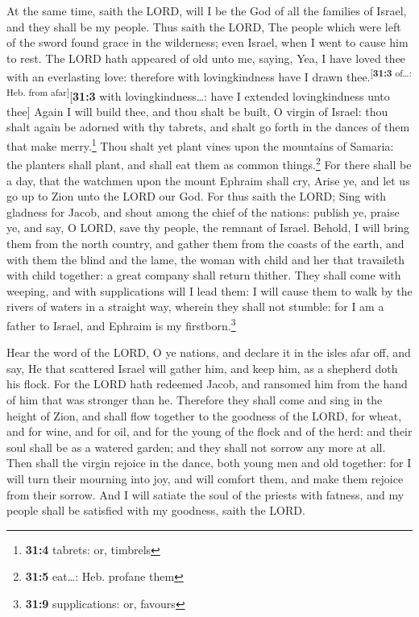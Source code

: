  At the same time, saith the LORD, will I be the God of
all the families of Israel, and they shall be my people. 
Thus saith the LORD, The people which were left of the sword found grace
in the wilderness; even Israel, when I went to cause him to rest.
 The LORD hath appeared of old unto me, saying, Yea, I
have loved thee with an everlasting love: therefore with lovingkindness
have I drawn thee.\textsuperscript{{[}\textbf{31:3} of\ldots: Heb. from
afar{]}}{[}\textbf{31:3} with lovingkindness\ldots: have I extended
lovingkindness unto thee{]}  Again I will build thee, and
thou shalt be built, O virgin of Israel: thou shalt again be adorned
with thy tabrets, and shalt go forth in the dances of them that make
merry.\footnote{\textbf{31:4} tabrets: or, timbrels}  Thou
shalt yet plant vines upon the mountains of Samaria: the planters shall
plant, and shall eat them as common things.\footnote{\textbf{31:5}
  eat\ldots: Heb. profane them}  For there shall be a day,
that the watchmen upon the mount Ephraim shall cry, Arise ye, and let us
go up to Zion unto the LORD our God.  For thus saith the
LORD; Sing with gladness for Jacob, and shout among the chief of the
nations: publish ye, praise ye, and say, O LORD, save thy people, the
remnant of Israel.  Behold, I will bring them from the
north country, and gather them from the coasts of the earth, and with
them the blind and the lame, the woman with child and her that
travaileth with child together: a great company shall return thither.
 They shall come with weeping, and with supplications will
I lead them: I will cause them to walk by the rivers of waters in a
straight way, wherein they shall not stumble: for I am a father to
Israel, and Ephraim is my firstborn.\footnote{\textbf{31:9}
  supplications: or, favours}

 Hear the word of the LORD, O ye nations, and declare it
in the isles afar off, and say, He that scattered Israel will gather
him, and keep him, as a shepherd doth his flock.  For the
LORD hath redeemed Jacob, and ransomed him from the hand of him that was
stronger than he.  Therefore they shall come and sing in
the height of Zion, and shall flow together to the goodness of the LORD,
for wheat, and for wine, and for oil, and for the young of the flock and
of the herd: and their soul shall be as a watered garden; and they shall
not sorrow any more at all.  Then shall the virgin
rejoice in the dance, both young men and old together: for I will turn
their mourning into joy, and will comfort them, and make them rejoice
from their sorrow.  And I will satiate the soul of the
priests with fatness, and my people shall be satisfied with my goodness,
saith the LORD.

